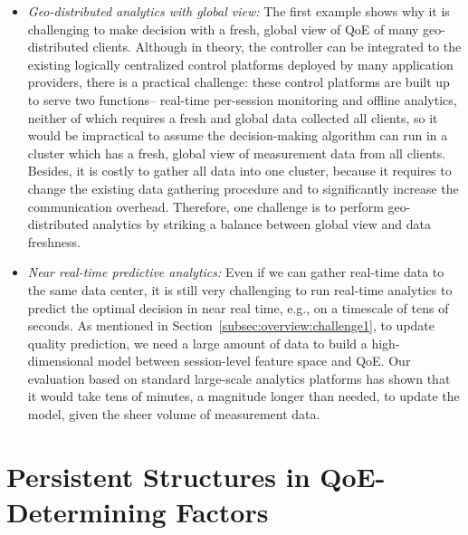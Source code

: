 \begin{itemize}
\item {\em Geo-distributed analytics with global view:} 
The first example shows why it is challenging to 
make decision with a fresh, global view of QoE of 
many geo-distributed clients.
Although in theory, the \ddn controller can be 
integrated to the existing logically centralized control 
platforms deployed by many application providers,
there is a practical challenge: these control platforms 
are built up to serve two functions--
real-time per-session monitoring and 
offline analytics, neither of which requires a fresh 
and global data collected all clients, so it would be 
impractical to assume the decision-making algorithm 
can run in a cluster which has a fresh, global view 
of measurement data from all clients. 
Besides, it is costly to gather all data into one cluster,
because it requires to change the existing 
data gathering procedure and to significantly increase 
the communication overhead.
Therefore, one challenge is to 
perform geo-distributed analytics by striking a 
balance between global view and data freshness.

\item {\em Near real-time predictive analytics:}
Even if we can gather real-time data to the same data 
center, it is still very challenging to run real-time 
analytics to predict the optimal decision in near 
real time, e.g., on a timescale of tens of seconds.
As mentioned in 
Section~\ref{subsec:overview:challenge1},
to update quality prediction, we need a large amount 
of data to build a high-dimensional model between 
session-level feature space and QoE.
Our evaluation based on standard large-scale
analytics platforms has shown that it would take
tens of minutes, a magnitude longer than needed,
to update the model, given the sheer volume of
measurement data.

\end{itemize}



\section{Persistent Structures in QoE-Determining Factors}
\label{sec:overview:unifying}

